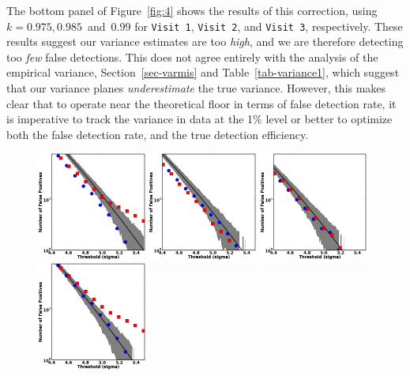 \documentclass[floatfix, apj]{emulateapj}
\begin{document}
The bottom panel of Figure~\ref{fig:4} shows the results of this correction, using $k = 0.975, 0.985 $~and~$ 0.99$ for {\tt Visit 1}, {\tt Visit 2}, and {\tt Visit 3}, respectively.
These results suggest our variance estimates are too {\it high}, and we are therefore detecting too {\it few} false detections.
This does not agree entirely with the analysis of the empirical variance, Section~\ref{sec-varmis} and Table~\ref{tab-variance1}, which suggest that our variance planes {\it underestimate} the true variance.
However, this makes clear that to operate near the theoretical floor in terms of false detection rate, it is imperative to track the variance in data at the 1\% level or better to optimize both the false detection rate, and the true detection efficiency.
\begin{figure}[!ht]
  \centering
  \includegraphics[width=0.32\textwidth]{fig4a.eps}
  \includegraphics[width=0.32\textwidth]{fig4b.eps}
  \includegraphics[width=0.32\textwidth]{fig4c.eps} \\
  \includegraphics[width=0.32\textwidth]{fig4d.eps}

\end{figure}
\end{document}

